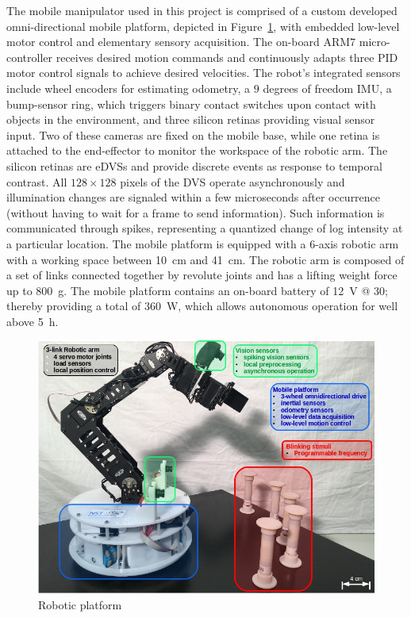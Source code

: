 The mobile manipulator used in this project is comprised of a custom developed omni-directional mobile platform, depicted in Figure~\ref{fig:omniarmbot}, with embedded low-level motor control and elementary sensory acquisition. 
The on-board ARM7 micro-controller receives desired motion commands and continuously adapts three PID motor control signals to achieve desired velocities. 
The robot's integrated sensors include wheel encoders for estimating odometry, a $9$ degrees of freedom \ac{IMU}, a bump-sensor ring, which triggers binary contact switches upon contact with objects in the environment, and three silicon retinas providing visual sensor input. 
Two of these cameras are fixed on the mobile base, while one retina is attached to the end-effector to monitor the workspace of the robotic arm. 
The silicon retinas are \acp{eDVS} and provide discrete events as response to temporal contrast. 
All $128 \times 128$ pixels of the \ac{DVS} operate asynchronously and illumination changes are signaled within a few microseconds after occurrence (without having to wait for a frame to send information). 
Such information is communicated through spikes, representing a quantized change of log intensity at a particular location. 
The mobile platform is equipped with a $6$-axis robotic arm with a working space between \SI{10}{\centi\metre} and \SI{41}{\centi\metre}. 
The robotic arm is composed of a set of links connected together by revolute joints and has a lifting weight force up to \SI{800}{\gram}. 
The mobile platform contains an on-board battery of \SI{12}{\volt} @ \SI{30}{\amperehour}; thereby providing a total of \SI{360}{\watt}, which allows autonomous operation for well above \SI{5}{\hour}.

\begin{figure}[t]
    \centering
    \includegraphics[width=0.8\linewidth]{imgs/omniarmbot.png}
    \caption{Robotic platform}
    \label{fig:omniarmbot}
\end{figure}

